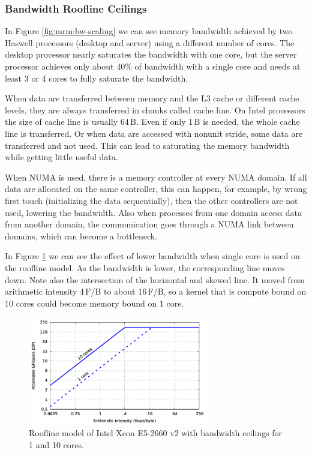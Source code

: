 \subsubsection*{Bandwidth Roofline Ceilings}


In Figure \ref{fig:mrm:bw-scaling} we can see memory bandwidth achieved by two Haswell processors (desktop and server) using a different number of cores. The desktop processor nearly saturates the bandwidth with one core, but the server processor achieves only about 40\% of bandwidth with a single core and needs at least 3 or 4 cores to fully saturate the bandwidth.

When data are transferred between memory and the L3 cache or different cache levels, they are always transferred in chunks called cache line. On Intel processors the size of cache line is usually 64\,B. Even if only 1\,B is needed, the whole cache line is transferred. Or when data are accessed with nonunit stride, some data are transferred and not used. This can lead to saturating the memory bandwidth while getting little useful data.

When NUMA is used, there is a memory controller at every NUMA domain. If all data are allocated on the same controller, this can happen, for example, by wrong first touch (initializing the data sequentially), then the other controllers are not used, lowering the bandwidth. Also when processes from one domain access data from another domain, the communication goes through a NUMA link between domains, which can become a bottleneck.

In Figure \ref{fig:roofline_emmy_memory-ceilings} we can see the effect of lower bandwidth when single core is used on the roofline model. As the bandwidth is lower, the corresponding line moves down. Note also the intersection of the horizontal and skewed line. It moved from arithmetic intensity 4\,F/B to about 16\,F/B, so a kernel that is compute bound on 10 cores could become memory bound on 1 core.

\begin{figure}[t]
   \centering
   \includegraphics[width=0.7\textwidth,clip=true]{images/roofline/roofline_emmy_Xeon2660v2_memory-ceilings.pdf}
   \caption{Roofline model of Intel Xeon E5-2660 v2 with bandwidth ceilings for 1 and 10 cores.}
  \label{fig:roofline_emmy_memory-ceilings}
\end{figure}

